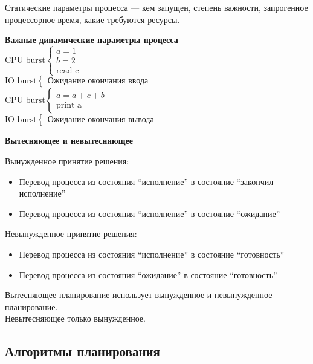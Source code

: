 \documentclass[12pt, a4paper]{article}
\begin{document}
    Статические параметры процесса --- кем запущен, степень важности, запрогенное процессорное время, какие требуются ресурсы.
    \begin{center}
        \textbf{Важные динамические параметры процесса}\\
        $\text{CPU burst} \begin{cases}
            a = 1\\
            b = 2\\
            \text{read c}
        \end{cases}$\\
        $\text{IO burst} \begin{cases}\text{Ожидание окончания ввода}\end{cases}$\\
        $\text{CPU burst}\begin{cases}
            a = a + c + b\\
            \text{print a}
        \end{cases}$\\
        $\text{IO burst}\begin{cases}
            \text{Ожидание окончания вывода}
        \end{cases}$
    \end{center}
    \begin{center}
        \textbf{Вытесняющее и невытесняющее}
    \end{center}
    Вынужденное принятие решения:
    \begin{itemize}
        \item Перевод процесса из состояния ``исполнение'' в состояние ``закончил исполнение''
        \item Перевод процесса из состояния ``исполнение'' в состояние ``ожидание''
    \end{itemize}
    Невынужденное принятие решения:
    \begin{itemize}
        \item Перевод процесса из состояния ``исполнение'' в состояние ``готовность''
        \item Перевод процесса из состояния ``ожидание'' в состояние ``готовность''
    \end{itemize}
    Вытесняющее планирование использует вынужденное и невынужденное планирование.\\
    Невытесняющее только вынужденное.
    \subsection*{Алгоритмы планирования}
\end{document}

